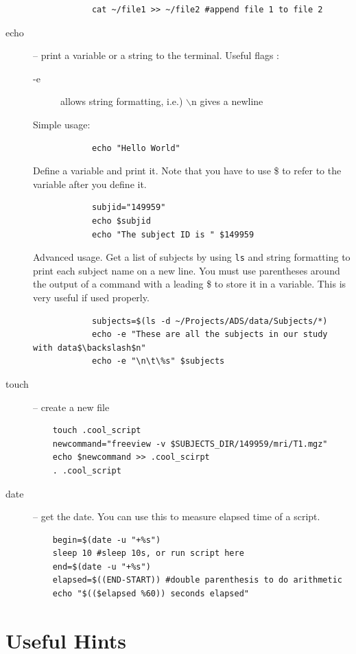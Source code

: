 \documentclass[paper=a4, fontsize=11pt]{scrartcl} %
\numberwithin{equation}{section} %
\numberwithin{figure}{section} %
\numberwithin{table}{section} %
\begin{document}
\begin{appendices}
\begin{description}
\begin{lstlisting}
			cat ~/file1 >> ~/file2 #append file 1 to file 2
			\end{lstlisting}							
\item[echo] -- print a variable or a string to the terminal. Useful flags :
			\begin{description}
			\item[-e] allows string formatting, i.e.) $\backslash$n gives a newline
			\end{description}
			Simple usage:
			\begin{lstlisting}
			echo "Hello World"
			\end{lstlisting}
			Define a variable and print it.  Note that you have to use \$ to refer to the variable after you define it.		
			\begin{lstlisting}
			subjid="149959"
			echo $subjid
			echo "The subject ID is " $149959
			\end{lstlisting}						
			Advanced usage.  Get a list of subjects by using \texttt{ls} and string formatting to print each subject name on a new line.  You must use parentheses around the output of a command with a leading \$ to store it in a variable.  This is very useful if used properly.
			\begin{lstlisting}
			subjects=$(ls -d ~/Projects/ADS/data/Subjects/*)
			echo -e "These are all the subjects in our study with data$\backslash$n" 
			echo -e "\n\t\%s" $subjects
			\end{lstlisting}											
\item[touch] -- create a new file
	\begin{lstlisting}
	touch .cool_script
	newcommand="freeview -v $SUBJECTS_DIR/149959/mri/T1.mgz"
	echo $newcommand >> .cool_scirpt
	. .cool_script
	\end{lstlisting}
\item[date] -- get the date.
	You can use this to measure elapsed time of a script.
	\begin{lstlisting}
	begin=$(date -u "+%s")
	sleep 10 #sleep 10s, or run script here
	end=$(date -u "+%s")
	elapsed=$((END-START)) #double parenthesis to do arithmetic
	echo "$(($elapsed %60)) seconds elapsed"
	\end{lstlisting}
\end{description}

\section{Useful Hints}


\end{appendices}
\end{document}
